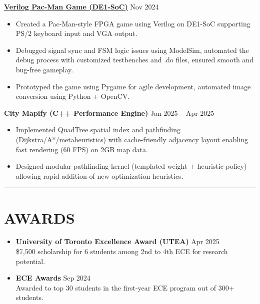 \documentclass[letterpaper,10pt]{article}
\begin{document}
\vspace{0.3em}
\noindent\href{https://github.com/Ken-2511/ECE241-Project}{\uline{
\textbf{Verilog Pac-Man Game (DE1-SoC)}}} \hfill Nov 2024
\begin{itemize}[leftmargin=0.2in]
    \item Created a Pac-Man-style FPGA game using Verilog on DE1-SoC supporting PS/2 keyboard input and VGA output.
    \item Debugged signal sync and FSM logic issues using ModelSim, automated the debug process with customized testbenches and .do files, ensured smooth and bug-free gameplay.
    \item Prototyped the game using Pygame for agile development, automated image conversion using Python + OpenCV.
\end{itemize}

\vspace{0.3em}
\noindent\textbf{City Mapify (C++ Performance Engine)} \hfill Jan 2025 -- Apr 2025
\begin{itemize}[leftmargin=0.2in]
  \item Implemented QuadTree spatial index and pathfinding (Dijkstra/A*/metaheuristics) with cache-friendly adjacency layout enabling fast rendering (60 FPS) on 2GB map data.
  \item Designed modular pathfinding kernel (templated weight + heuristic policy) allowing rapid addition of new optimization heuristics.
\end{itemize}

\noindent\rule{\linewidth}{1pt}

\section*{\textbf{AWARDS}}
\begin{itemize}[leftmargin=0.2in]
	\item \textbf{University of Toronto Excellence Award (UTEA)} \hfill Apr 2025\\
    \$7,500 scholarship for 6 students among 2nd to 4th ECE for research potential.
	\item \textbf{ECE Awards} \hfill Sep 2024\\
	Awarded to top 30 students in the first-year ECE program out of 300+ students.
\end{itemize}
\end{document}
